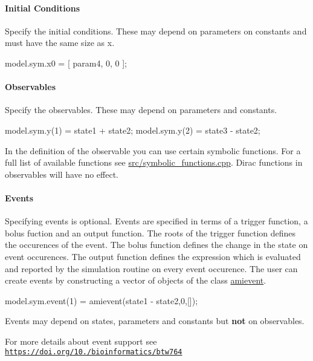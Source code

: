 \paragraph*{Initial Conditions}

Specify the initial conditions. These may depend on parameters on constants and must have the same size as {\ttfamily x}. \begin{DoxyVerb}model.sym.x0 = [ param4, 0, 0 ];
\end{DoxyVerb}


\paragraph*{Observables}

Specify the observables. These may depend on parameters and constants. \begin{DoxyVerb}model.sym.y(1) = state1 + state2;
model.sym.y(2) = state3 - state2;
\end{DoxyVerb}


In the definition of the observable you can use certain symbolic functions. For a full list of available functions see {\ttfamily \mbox{\hyperlink{symbolic__functions_8cpp}{src/symbolic\+\_\+functions.\+cpp}}}. Dirac functions in observables will have no effect.

\paragraph*{Events}

Specifying events is optional. Events are specified in terms of a trigger function, a bolus fuction and an output function. The roots of the trigger function defines the occurences of the event. The bolus function defines the change in the state on event occurences. The output function defines the expression which is evaluated and reported by the simulation routine on every event occurence. The user can create events by constructing a vector of objects of the class \mbox{\hyperlink{classamievent}{amievent}}. \begin{DoxyVerb}model.sym.event(1) = amievent(state1 - state2,0,[]);
\end{DoxyVerb}


Events may depend on states, parameters and constants but {\bfseries not} on observables.

For more details about event support see \href{https://doi.org/10.1093/bioinformatics/btw764}{\tt https\+://doi.\+org/10./bioinformatics/btw764}

